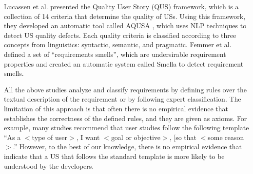 Lucassen et al. \cite{lucassen2015forging} presented the Quality User Story (QUS) framework, which is a collection of 14 criteria that determine the quality of USs. 
Using this framework, they developed an automatic tool called AQUSA \cite{lucassen2016improving}, which uses NLP techniques to detect US quality defects.
Each quality criteria is classified according to three concepts from linguistics: syntactic, semantic, and pragmatic. 
Femmer et al.~\cite{femmer2017rapid} defined a set of ``requirements smells'', which are
undersirable requirement properties and created an automatic system called Smella to detect requirement smells. 



All the above studies analyze and classify requirements by defining rules over the textual description of the requirement or by following expert classification. 
The limitation of this approach is that often there is no empirical evidence that establishes the correctness of the defined rules, and they are given as axioms. 
For example, many studies recommend that user studies follow the following template ``As a $<$type of user$>$, I want $<$goal or objective$>$, [so that $<$some reason$>$.'' 
However, to the best of our knowledge, there is no empirical evidence that indicate that a US that follows the standard template is more likely to be understood by the developers.



